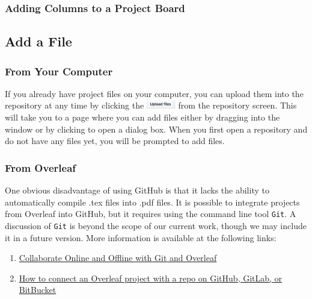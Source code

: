 \documentclass[11pt]{article}
\begin{document}
\subsubsection{Adding Columns to a Project Board}



\subsection{Add a File}

\subsubsection{From Your Computer} 

If you already have project files on your computer, you can upload them into the repository at any time by clicking the \includegraphics[width=0.5in]{UploadFilesbutton} from the repository screen. This will take you to a page where you can add files either by dragging into the window or by clicking to open a dialog box. When you first open a repository and do not have any files yet, you will be prompted to add files. 

\subsubsection{From Overleaf}

One obvious disadvantage of using GitHub is that it lacks the ability to automatically compile .tex files into .pdf files. 
It is possible to integrate projects from Overleaf into GitHub, but it requires using the command line tool \texttt{Git}. A discussion of \texttt{Git} is beyond the scope of our current work, though we may include it in a future version. More information is available at the following links: \\

\begin{enumerate}
\item \href{https://www.overleaf.com/blog/195-new-collaborate-online-and-offline-with-overleaf-and-git-beta#.Wx6qPI5r06Y}{Collaborate Online and Offline with Git and Overleaf}
\item \href{https://www.overleaf.com/help/233-how-do-i-connect-an-overleaf-project-with-a-repo-on-github#.Wx6qfY5r06Y}{ How to connect an Overleaf project with a repo on GitHub, GitLab, or BitBucket}
\end{enumerate}
\end{document}
